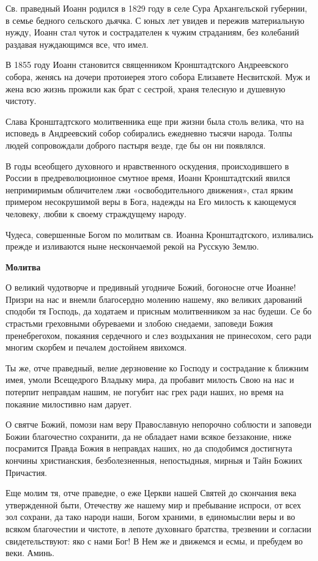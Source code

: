 Св. праведный Иоанн родился в 1829 году в селе Сура Архангельской губернии, в семье бедного сельского дьячка. С юных лет увидев и пережив материальную нужду, Иоанн стал чуток и сострадателен к чужим страданиям, без колебаний раздавая нуждающимся все, что имел. 


В 1855 году Иоанн становится священником Кронштадтского Андреевского собора, женясь на дочери протоиерея этого собора Елизавете Несвитской. Муж и жена всю жизнь прожили как брат с сестрой, храня телесную и душевную чистоту. 


Слава Кронштадтского молитвенника еще при жизни была столь велика, что на исповедь в Андреевский собор собирались ежедневно тысячи народа. Толпы людей сопровождали доброго пастыря везде, где бы он ни появлялся. 


В годы всеобщего духовного и нравственного оскудения, происходившего в России в предреволюционное смутное время, Иоанн Кронштадтский явился непримиримым обличителем лжи «освободительного движения», стал ярким примером несокрушимой веры в Бога, надежды на Его милость к кающемуся человеку, любви к своему страждущему народу. 


Чудеса, совершенные Богом по молитвам св. Иоанна Кронштадтского, изливались прежде и изливаются ныне нескончаемой рекой на Русскую Землю.


\medskip
\bfseries Молитва\normalfont{}


О великий чудотворче и предивный угодниче Божий, богоносне отче Иоанне! Призри на нас и внемли благосердно молению нашему, яко великих дарований сподоби тя Господь, да ходатаем и присным молитвенником за нас будеши. Се бо страстьми греховными обуреваеми и злобою снедаеми, заповеди Божия пренебрегохом, покаяния сердечного и слез воздыхания не принесохом, сего ради многим скорбем и печалем достойнем явихомся. 


Ты же, отче праведный, велие дерзновение ко Господу и сострадание к ближним имея, умоли Всещедрого Владыку мира, да пробавит милость Свою на нас и потерпит неправдам нашим, не погубит нас грех ради наших, но время на покаяние милостивно нам дарует. 


О святче Божий, помози нам веру Православную непорочно соблюсти и заповеди Божии благочестно сохранити, да не обладает нами всякое беззаконие, ниже посрамится Правда Божия в неправдах наших, но да сподобимся достигнута кончины христианския, безболезненныя, непостыдныя, мирныя и Тайн Божиих Причастия. 


Еще молим тя, отче праведне, о еже Церкви нашей Святей до скончания века утвержденной быти, Отечеству же нашему мир и пребывание испроси, от всех зол сохрани, да тако народи наши, Богом храними, в единомыслии веры и во всяком благочестии и чистоте, в лепоте духовнаго братства, трезвении и согласии свидетельствуют: яко с нами Бог! В Нем же и движемся и есмы, и пребудем во веки. Аминь.


